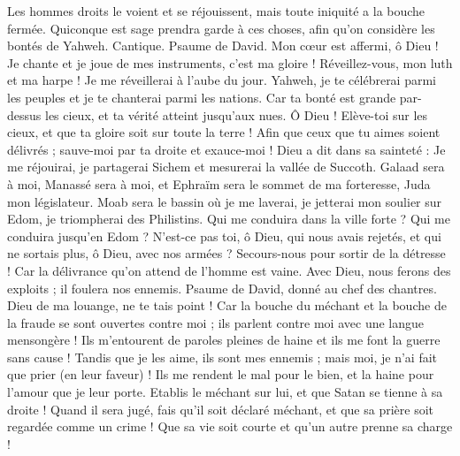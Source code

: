 \begin{multicols}{2}
Les hommes droits le voient et se réjouissent, mais toute iniquité a la bouche fermée.
Quiconque est sage prendra garde à ces choses, afin qu'on considère les bontés de Yahweh.
\VerseOne{}Cantique. Psaume de David. Mon cœur est affermi, ô Dieu ! Je chante et je joue de mes instruments, c’est ma gloire !
Réveillez-vous, mon luth et ma harpe ! Je me réveillerai à l'aube du jour.
Yahweh, je te célébrerai parmi les peuples et je te chanterai parmi les nations.
Car ta bonté est grande par-dessus les cieux, et ta vérité atteint jusqu’aux nues.
Ô Dieu ! Elève-toi sur les cieux, et que ta gloire soit sur toute la terre !
Afin que ceux que tu aimes soient délivrés ; sauve-moi par ta droite et exauce-moi !
Dieu a dit dans sa sainteté : Je me réjouirai, je partagerai Sichem et mesurerai la vallée de Succoth.
Galaad sera à moi, Manassé sera à moi, et Ephraïm sera le sommet de ma forteresse, Juda mon législateur.
Moab sera le bassin où je me laverai, je jetterai mon soulier sur Edom, je triompherai des Philistins.
Qui me conduira dans la ville forte ? Qui me conduira jusqu’en Edom ?
N'est-ce pas toi, ô Dieu, qui nous avais rejetés, et qui ne sortais plus, ô Dieu, avec nos armées ?
Secours-nous pour sortir de la détresse ! Car la délivrance qu'on attend de l'homme est vaine.
Avec Dieu, nous ferons des exploits ; il foulera nos ennemis.
\VerseOne{}Psaume de David, donné au chef des chantres. Dieu de ma louange, ne te tais point !
Car la bouche du méchant et la bouche de la fraude se sont ouvertes contre moi ; ils parlent contre moi avec une langue mensongère !
Ils m’entourent de paroles pleines de haine et ils me font la guerre sans cause !
Tandis que je les aime, ils sont mes ennemis ; mais moi, je n'ai fait que prier (en leur faveur) !
Ils me rendent le mal pour le bien, et la haine pour l'amour que je leur porte.
Etablis le méchant sur lui, et que Satan se tienne à sa droite !
Quand il sera jugé, fais qu'il soit déclaré méchant, et que sa prière soit regardée comme un crime !
Que sa vie soit courte et qu'un autre prenne sa charge !

\end{multicols}
